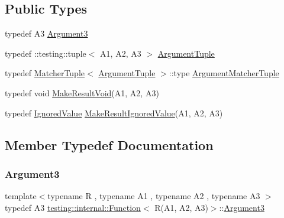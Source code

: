 \subsection*{Public Types}
\begin{DoxyCompactItemize}
\item 
typedef A3 \mbox{\hyperlink{structtesting_1_1internal_1_1_function_3_01_r_07_a1_00_01_a2_00_01_a3_08_4_a2ac6eefb33feafe85c1c6742bdab509f}{Argument3}}
\item 
typedef \+::testing\+::tuple$<$ A1, A2, A3 $>$ \mbox{\hyperlink{structtesting_1_1internal_1_1_function_3_01_r_07_a1_00_01_a2_00_01_a3_08_4_a6f1e1097947a9e13a4e29099a61de804}{Argument\+Tuple}}
\item 
typedef \mbox{\hyperlink{structtesting_1_1internal_1_1_matcher_tuple}{Matcher\+Tuple}}$<$ \mbox{\hyperlink{structtesting_1_1internal_1_1_function_3_01_r_07_08_4_ad483c3128c470d8cdb55c3ac1c575c11}{Argument\+Tuple}} $>$\+::type \mbox{\hyperlink{structtesting_1_1internal_1_1_function_3_01_r_07_a1_00_01_a2_00_01_a3_08_4_acb08fa0fffe1213ce88f53343bb3b564}{Argument\+Matcher\+Tuple}}
\item 
typedef void \mbox{\hyperlink{structtesting_1_1internal_1_1_function_3_01_r_07_a1_00_01_a2_00_01_a3_08_4_a6b9f583a9ef6755cc92ce2b7fa255b84}{Make\+Result\+Void}}(A1, A2, A3)
\item 
typedef \mbox{\hyperlink{classtesting_1_1internal_1_1_ignored_value}{Ignored\+Value}} \mbox{\hyperlink{structtesting_1_1internal_1_1_function_3_01_r_07_a1_00_01_a2_00_01_a3_08_4_abff7468ae8231766e7b396c8a407cb5a}{Make\+Result\+Ignored\+Value}}(A1, A2, A3)
\end{DoxyCompactItemize}


\subsection{Member Typedef Documentation}
\mbox{\label{structtesting_1_1internal_1_1_function_3_01_r_07_a1_00_01_a2_00_01_a3_08_4_a2ac6eefb33feafe85c1c6742bdab509f}} 
\subsubsection{\texorpdfstring{Argument3}{Argument3}}
{\footnotesize\ttfamily template$<$typename R , typename A1 , typename A2 , typename A3 $>$ \\
typedef A3 \mbox{\hyperlink{structtesting_1_1internal_1_1_function}{testing\+::internal\+::\+Function}}$<$ R(A1, A2, A3)$>$\+::\mbox{\hyperlink{structtesting_1_1internal_1_1_function_3_01_r_07_a1_00_01_a2_00_01_a3_08_4_a2ac6eefb33feafe85c1c6742bdab509f}{Argument3}}}

